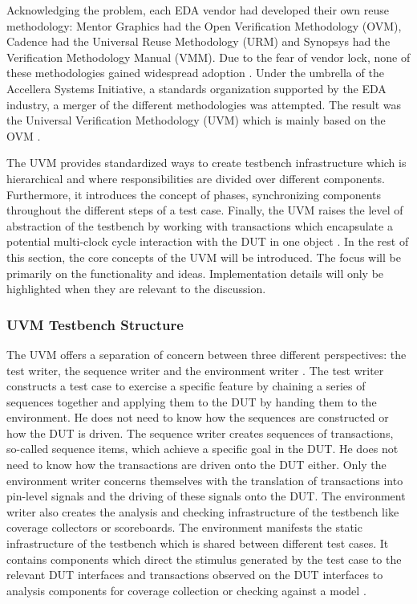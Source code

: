 \documentclass[12pt]{report}
\begin{document}
Acknowledging the problem, each EDA vendor had developed their own reuse methodology: Mentor Graphics had the Open
Verification Methodology (OVM), Cadence had the Universal Reuse Methodology (URM) and Synopsys had the Verification
Methodology Manual (VMM). Due to the fear of vendor lock, none of these methodologies gained widespread adoption
\cite[ch. 4.1]{mehta2018asic}. Under the umbrella of the Accellera Systems Initiative, a standards organization
supported by the EDA industry, a merger of the different methodologies was attempted. The result was the Universal
Verification Methodology (UVM) which is mainly based on the OVM \cite[ch. 4.1]{mehta2018asic}.

The UVM provides standardized ways to create testbench infrastructure which is hierarchical and where
responsibilities are divided over different components. Furthermore, it introduces the concept of phases,
synchronizing components throughout the different steps of a test case. Finally, the UVM raises the level of
abstraction of the testbench by working with transactions which encapsulate a potential multi-clock cycle interaction
with the DUT in one object \cite[ch. 4.1]{mehta2018asic}. In the rest of this section, the core concepts of the UVM
will be introduced. The focus will be primarily on the functionality and ideas. Implementation details will only be
highlighted when they are relevant to the discussion.

\subsubsection{UVM Testbench Structure} %

The UVM offers a separation of concern between three different perspectives: the test writer, the sequence writer and
the environment writer \cite{sutherland2015uvm}. The test writer constructs a test case to exercise a specific
feature by chaining a series of sequences together and applying them to the DUT by handing them to the environment.
He does not need to know how the sequences are constructed or how the DUT is driven. The sequence writer creates
sequences of transactions, so-called sequence items, which achieve a specific goal in the DUT. He does not need to
know how the transactions are
driven onto the DUT either. Only the environment writer concerns themselves with the translation of transactions into
pin-level signals and the driving of these signals onto the DUT. The environment writer also creates the analysis and
checking infrastructure of the testbench like coverage collectors or scoreboards. The environment manifests the
static infrastructure of the testbench which is shared between different test cases. It contains components which
direct the stimulus generated by the test case to the relevant DUT interfaces and transactions observed on the DUT
interfaces to analysis components for coverage
collection or checking against a model \cite{sutherland2015uvm}.
\end{document}
